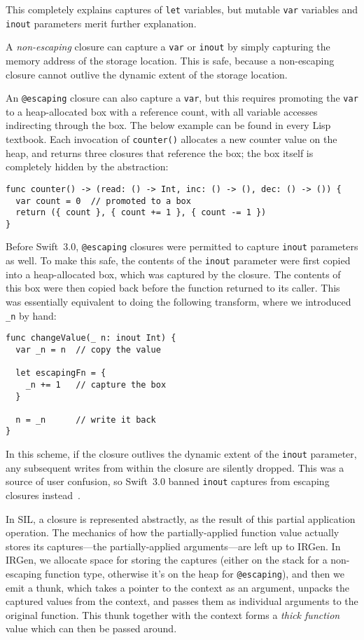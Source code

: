 \documentclass[../generics]{subfiles}
\begin{document}
This completely explains captures of \texttt{let} variables, but mutable \texttt{var} variables and \texttt{inout} parameters merit further explanation.

A \emph{non-escaping} closure can capture a \texttt{var} or \texttt{inout} by simply capturing the memory address of the storage location. This is safe, because a non-escaping closure cannot outlive the dynamic extent of the storage location.

An \texttt{@escaping} closure can also capture a \texttt{var}, but this requires promoting the \texttt{var} to a heap-allocated box with a reference count, with all variable accesses indirecting through the box. The below example can be found in every Lisp textbook. Each invocation of \texttt{counter()} allocates a new counter value on the heap, and returns three closures that reference the box; the box itself is completely hidden by the abstraction:
\begin{Verbatim}
func counter() -> (read: () -> Int, inc: () -> (), dec: () -> ()) {
  var count = 0  // promoted to a box
  return ({ count }, { count += 1 }, { count -= 1 })
}
\end{Verbatim}

Before Swift~3.0, \texttt{@escaping} closures were permitted to capture \texttt{inout} parameters as well. To make this safe, the contents of the \texttt{inout} parameter were first copied into a heap-allocated box, which was captured by the closure. The contents of this box were then copied back before the function returned to its caller. This was essentially equivalent to doing the following transform, where we introduced \verb|_n| by hand:
\begin{Verbatim}
func changeValue(_ n: inout Int) {
  var _n = n  // copy the value

  let escapingFn = {
    _n += 1   // capture the box
  }

  n = _n      // write it back
}
\end{Verbatim}
In this scheme, if the closure outlives the dynamic extent of the \texttt{inout} parameter, any subsequent writes from within the closure are silently dropped. This was a source of user confusion, so Swift~3.0 banned \texttt{inout} captures from escaping closures instead~\cite{se0035}.

In SIL, a closure is represented abstractly, as the result of this partial application operation. The mechanics of how the partially-applied function value actually stores its captures---the partially-applied arguments---are left up to IRGen. In IRGen, we allocate space for storing the captures (either on the stack for a non-escaping function type, otherwise it's on the heap for \texttt{@escaping}), and then we emit a thunk, which takes a pointer to the context as an argument, unpacks the captured values from the context, and passes them as individual arguments to the original function. This thunk together with the context forms a \emph{thick function} value which can then be passed around.
\end{document}
